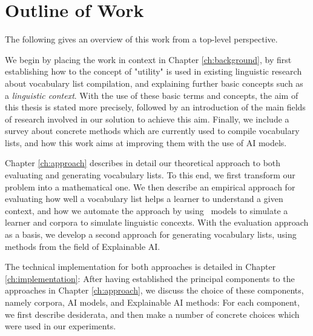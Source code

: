 


\section{Outline of Work}

The following gives an overview of this work from a top-level perspective.

We begin by placing the work in context in Chapter \ref{ch:background}, by first establishing how to the concept of "utility" is used in existing linguistic research about vocabulary list compilation, and explaining further basic concepts such as a \textit{linguistic context}.
With the use of these basic terms and concepts, the aim of this thesis is stated more precisely, followed by an introduction of the main fields of research involved in our solution to achieve this aim.
Finally, we include a survey about concrete methods which are currently used to compile vocabulary lists, and how this work aims at improving them with the use of AI models.

Chapter \ref{ch:approach} describes in detail our theoretical approach to both evaluating and generating vocabulary lists.
To this end, we first transform our problem into a mathematical one.
We then describe an empirical approach for evaluating how well a vocabulary list helps a learner to understand a given context, and how we automate the approach by using \AI\ models to simulate a learner and corpora to simulate linguistic concexts.
With the evaluation approach as a basis, we develop a second approach for generating vocabulary lists, using methods from the field of Explainable AI.

The technical implementation for both approaches is detailed in Chapter \ref{ch:implementation}:
After having established the principal components to the approaches in Chapter \ref{ch:approach}, we discuss the choice of these components, namely corpora, AI models, and Explainable AI methods:
For each component, we first describe desiderata, and then make a number of concrete choices which were used in our experiments.


